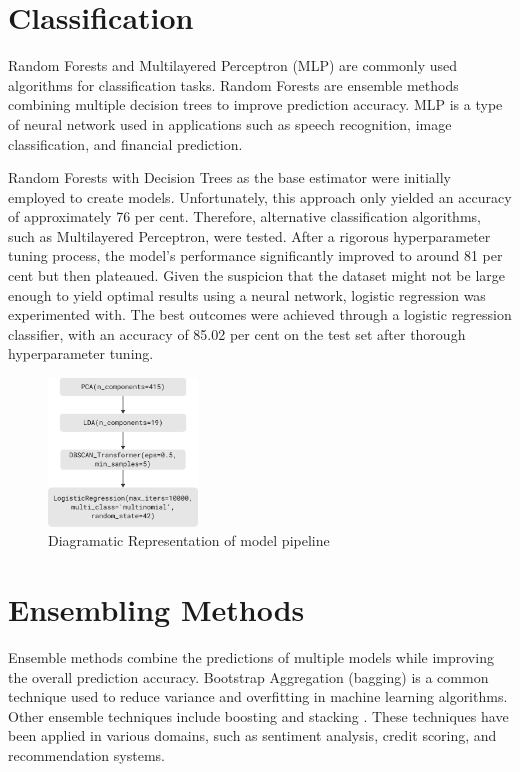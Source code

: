 \documentclass[conference]{IEEEtran}
\begin{document}
\section{Classification}

Random Forests \cite{rf} and Multilayered Perceptron (MLP) \cite{mlp} are commonly used algorithms for classification tasks. Random Forests are ensemble methods combining multiple decision trees to improve prediction accuracy. MLP is a type of neural network used in applications such as speech recognition, image classification, and financial prediction.


Random Forests with Decision Trees as the base estimator were initially employed to create models. Unfortunately, this approach only yielded an accuracy of approximately 76 per cent. Therefore, alternative classification algorithms, such as Multilayered Perceptron, were tested. After a rigorous hyperparameter tuning process, the model's performance significantly improved to around 81 per cent but then plateaued. Given the suspicion that the dataset might not be large enough to yield optimal results using a neural network, logistic regression was experimented with. The best outcomes were achieved through a logistic regression classifier, with an accuracy of 85.02 per cent on the test set after thorough hyperparameter tuning.


\begin{figure}
    \centering
    \includegraphics[width=150px]{pipeline.pdf}
    \caption{Diagramatic Representation of model pipeline}
    \label{fig:my_label}
\end{figure}


\section{Ensembling Methods}
Ensemble methods combine the predictions of multiple models while improving the overall prediction accuracy. Bootstrap Aggregation (bagging) \cite{bagging} is a common technique used to reduce variance and overfitting in machine learning algorithms. Other ensemble techniques include boosting \cite{boost} and stacking \cite{stack}. These techniques have been applied in various domains, such as sentiment analysis, credit scoring, and recommendation systems.
\end{document}
